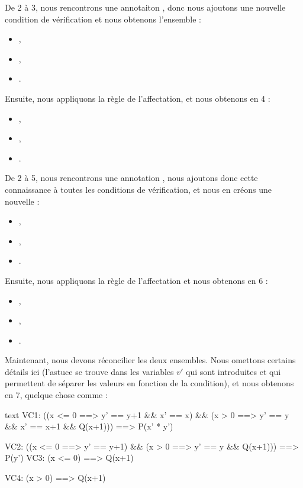 De 2 à 3, nous rencontrons une annotaiton , donc nous ajoutons
une nouvelle condition de vérification et nous obtenons l'ensemble :
\begin{itemize}
  \item {},
  \item {},
  \item {}.
\end{itemize}
Ensuite, nous appliquons la règle de l'affectation, et nous obtenons en 4 :
\begin{itemize}
  \item {},
  \item {},
  \item {}.
\end{itemize}


De 2 à 5, nous rencontrons une annotation , nous ajoutons
donc cette connaissance à toutes les conditions de vérification, et nous en
créons une nouvelle :
\begin{itemize}
  \item {},
  \item {},
  \item {}.
\end{itemize}
Ensuite, nous appliquons la règle de l'affectation et nous obtenons en 6 :
\begin{itemize}
  \item {},
  \item {},
  \item {}.
\end{itemize}


Maintenant, nous devons réconcilier les deux ensembles. Nous omettons certains
détails ici (l'astuce se trouve dans les variables $v'$ qui sont introduites et
qui permettent de séparer les valeurs en fonction de la condition), et nous
obtenons en 7, quelque chose comme :
\begin{CodeBlock}{text}
  VC1:
    ((x <= 0 ==> y' == y+1 && x' == x) &&
     (x >  0 ==> y' == y   && x' == x+1 && Q(x+1))) ==>
       P(x' * y')

  VC2:
    ((x <= 0 ==> y' == y+1) &&
     (x >  0 ==> y' == y    && Q(x+1))) ==>
       P(y')
  VC3:
    (x <= 0) ==> Q(x+1)

  VC4:
    (x >  0) ==> Q(x+1)
\end{CodeBlock}


